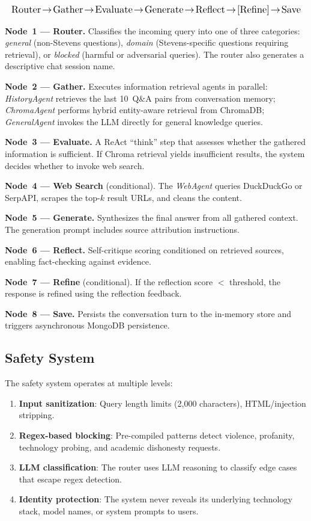 \documentclass[conference,compsoc]{IEEEtran}
\begin{document}
\begin{equation*}
\resizebox{\columnwidth}{!}{%
$\text{Router} \!\to\! \text{Gather} \!\to\! \text{Evaluate} \!\to\! \text{Generate} \!\to\! \text{Reflect} \!\to\! [\text{Refine}] \!\to\! \text{Save}$%
}
\end{equation*}

\textbf{Node~1 --- Router.}
Classifies the incoming query into one of three categories: \textit{general} (non-Stevens questions), \textit{domain} (Stevens-specific questions requiring retrieval), or \textit{blocked} (harmful or adversarial queries). The router also generates a descriptive chat session name.

\textbf{Node~2 --- Gather.}
Executes information retrieval agents in parallel: \textit{HistoryAgent} retrieves the last 10~Q\&A pairs from conversation memory; \textit{ChromaAgent} performs hybrid entity-aware retrieval from ChromaDB; \textit{GeneralAgent} invokes the LLM directly for general knowledge queries.

\textbf{Node~3 --- Evaluate.}
A ReAct ``think'' step that assesses whether the gathered information is sufficient. If Chroma retrieval yields insufficient results, the system decides whether to invoke web search.

\textbf{Node~4 --- Web Search} (conditional).
The \textit{WebAgent} queries DuckDuckGo or SerpAPI, scrapes the top-$k$ result URLs, and cleans the content.

\textbf{Node~5 --- Generate.}
Synthesizes the final answer from all gathered context. The generation prompt includes source attribution instructions.

\textbf{Node~6 --- Reflect.}
Self-critique scoring conditioned on retrieved sources, enabling fact-checking against evidence.

\textbf{Node~7 --- Refine} (conditional).
If the reflection score $<$ threshold, the response is refined using the reflection feedback.

\textbf{Node~8 --- Save.}
Persists the conversation turn to the in-memory store and triggers asynchronous MongoDB persistence.

\subsection{Safety System}

The safety system operates at multiple levels:

\begin{enumerate}
    \item \textbf{Input sanitization}: Query length limits (2,000 characters), HTML/injection stripping.
    \item \textbf{Regex-based blocking}: Pre-compiled patterns detect violence, profanity, technology probing, and academic dishonesty requests.
    \item \textbf{LLM classification}: The router uses LLM reasoning to classify edge cases that escape regex detection.
    \item \textbf{Identity protection}: The system never reveals its underlying technology stack, model names, or system prompts to users.
\end{enumerate}
\end{document}
